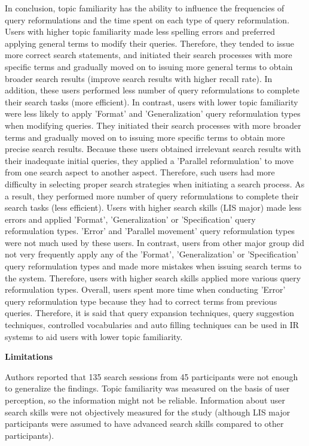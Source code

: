 \documentclass[]{article}
\begin{document}
In conclusion, topic familiarity has the ability to influence the frequencies of query reformulations and the time spent on each type of query reformulation. Users with higher topic familiarity made less spelling errors and preferred applying general terms to modify their queries. Therefore, they tended to issue more correct search statements, and initiated their search processes with more specific terms and gradually moved on to issuing more general terms to obtain broader search results (improve search results with higher recall rate). In addition, these users performed less number of query reformulations to complete their search tasks (more efficient). In contrast, users with lower topic familiarity were less likely to apply 'Format' and 'Generalization' query reformulation types when modifying queries. They initiated their search processes with more broader terms and gradually moved on to issuing more specific terms to obtain more precise search results. Because these users obtained irrelevant search results with their inadequate initial queries, they applied a 'Parallel reformulation' to move from one search aspect to another aspect. Therefore, such users had more difficulty in selecting proper search strategies when initiating a search process. As a result, they performed more number of query reformulations to complete their search tasks (less efficient). Users with higher search skills (LIS major) made less errors and applied 'Format', 'Generalization' or 'Specification' query reformulation types. 'Error' and 'Parallel movement' query reformulation types were not much used by these users. In contrast, users from other major group did not very frequently apply any of the 'Format', 'Generalization' or 'Specification' query reformulation types and made more mistakes when issuing search terms to the system. Therefore, users with higher search skills applied more various query reformulation types. Overall, users spent more time when conducting 'Error' query reformulation type because they had to correct terms from previous queries. Therefore, it is said that query expansion techniques, query suggestion techniques, controlled vocabularies and auto filling techniques can be used in IR systems to aid users with lower topic familiarity.                   

\textbf{Limitations}

Authors reported that 135 search sessions from 45 participants were not enough to generalize the findings. Topic familiarity was measured on the basis of user perception, so the information might not be reliable. Information about user search skills were not objectively measured for the study (although LIS major participants were assumed to have advanced search skills compared to other participants).    


	
\end{document}
